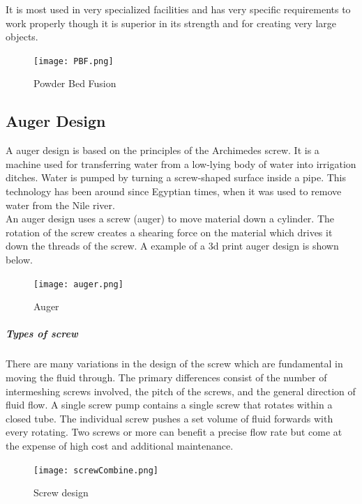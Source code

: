 \documentclass[11pt]{article}
\begin{document}
It is most used in very specialized facilities and has very specific requirements to work properly though it is superior in its strength and for creating very large objects.  \\


\begin{figure}[hbtp]
\caption{Powder Bed Fusion}
\centering
\texttt{[image: PBF.png]}
\end{figure}



\newpage


\subsection{Auger Design}

A auger design is based on the principles of the Archimedes screw. It is a machine  used for transferring water from a low-lying body of water into irrigation ditches. Water is pumped by turning a screw-shaped surface inside a pipe.  This technology has been around since Egyptian times, when it was used to remove water from the Nile river.\\

 An auger design uses a screw (auger) to move material down a cylinder. The rotation of the screw creates a shearing force on the material which drives it down the threads of the screw. A example of a 3d print auger design is shown below.\\
 
 \begin{figure}[hbtp]
 \caption{Auger}
 \centering
 \texttt{[image: auger.png]}
 \end{figure}
 

 
  \subparagraph{Types of screw}
 There are many variations in the design of the screw which are fundamental in moving the fluid through. The primary differences consist of the number of intermeshing screws involved, the pitch of the screws, and the general direction of fluid flow. A single screw pump contains a single screw that rotates within a closed tube. The individual screw pushes a set volume of fluid forwards with every rotating. Two screws or more can benefit a precise flow rate but  come at the expense of high cost and additional maintenance. 
\\
 \begin{figure}[hbtp]
 \caption{Screw design}
 \centering
 \texttt{[image: screwCombine.png]}
 \end{figure}
 
\end{document}
